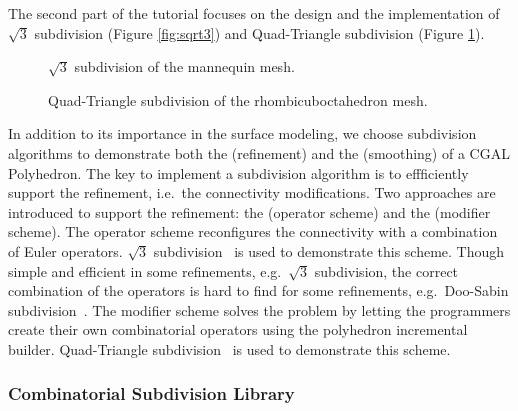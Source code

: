 \documentclass[letter,twocolumn]{article}
\begin{document}
The second part of the tutorial focuses on the design and the
implementation of $\sqrt{3}$ subdivision (Figure \ref{fig:sqrt3}) 
and Quad-Triangle subdivision (Figure \ref{fig:quad-triangle}).  

\begin{figure}[htb]
    \caption{$\sqrt{3}$ subdivision of the mannequin mesh.}
    \label{fig:sqrt3}
    \vspace{0.5cm}
    \caption{Quad-Triangle subdivision of the rhombicuboctahedron mesh.}
    \label{fig:quad-triangle}
\end{figure}

In addition to its importance in the surface modeling, we 
choose subdivision algorithms to demonstrate both the 
 (refinement) and the
 (smoothing) of a
CGAL Polyhedron. 
The key to implement a subdivision algorithm is to effficiently support
the refinement, i.e.\ the connectivity modifications. Two approaches
are introduced to support the refinement: the  (operator scheme) and
the  (modifier scheme). 
The operator scheme reconfigures the connectivity with a 
combination of Euler operators. $\sqrt{3}$ subdivision~\cite{sqrt3} is
used to demonstrate this scheme. Though simple and efficient in some
refinements, e.g.\ $\sqrt{3}$ subdivision, the correct combination of
the operators is hard to find for some refinements, e.g.\ Doo-Sabin
subdivision~\cite{ds}. The modifier scheme solves the problem by
letting the programmers create their own combinatorial operators 
using the polyhedron incremental builder. Quad-Triangle
subdivision~\cite{qts,l-pg-03} is used to demonstrate this scheme.

\subsubsection*{Combinatorial Subdivision Library}
\end{document}
